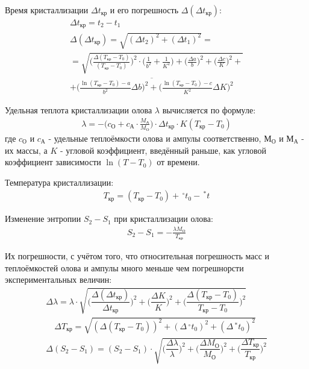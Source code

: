 \documentclass{article}
\begin{document}
Время кристаллизации $\Delta t_{ \text{кр}}$ и его погрешность $\Delta (\Delta t_{ \text{кр}})$:
\begin{gather*}
    \Delta t_{ \text{кр}} = t_2 - t_1\\
    \Delta (\Delta t_{ \text{кр}})=\sqrt{(\Delta t_2)^2+(\Delta t_1)^2} =\\ 
        =\sqrt{\bigg( \frac{ \Delta{(T_{\text{кр}}-T_0)}}{ (T_{\text{кр}}-T_0)} \bigg)^2\cdot\bigg( \frac{ 1}{ b^2} + \frac{ 1}{ K^2}\bigg)+\bigg( \frac{ \Delta{a}}{ b} \bigg)^2 + \bigg( \frac{ \Delta{c}}{ K} \bigg)^2 +} \\
         \overline{+  
        \bigg( \frac{ \ln(T_{ \text{кр}}-T_0)-a}{ b^2}\Delta{b} \bigg)^2 + \bigg( \frac{ \ln(T_{ \text{кр}}-T_0)-c}{ K^2}\Delta{K} \bigg)^2}
\end{gather*}

Удельная теплота кристаллизации олова $\lambda$ вычисляется по формуле:
\begin{gather*}
    \lambda = -\bigg( c_{ \text{О}} + c_{ \text{А}} \cdot \frac{ M_{ \text{А}}}{ M_{ \text{О}}} \bigg)
        \cdot \Delta t_{ \text{кр}} \cdot K(T_{ \text{кр}} - T_{ 0})
\end{gather*}
где $c_{ \text{О}}$ и $c_{ \text{А}}$ - удельные теплоёмкости олова и ампулы соответственно, 
$М_{ \text{О}}$ и $М_{ \text{А}}$ - их массы,
а $K$ - угловой коэффициент, введённый раньше, как угловой коэффициент зависимости $\ln(T-T_0)$ от времени.

Температура кристаллизации:
\begin{gather*}
    T_{ \text{кр}}=(T_{ \text{кр}}-T_0) + \,^\circ t_{ 0} - \,^*t
\end{gather*}

Изменение энтропии $S_2 - S_1$ при кристаллизации олова:
\begin{gather*}
    S_{ 2} - S_{ 1} = - \frac{ \lambda{M_{ \text{О}}}}{ T_{ \text{кр}}}
\end{gather*}

Их погрешности, с учётом того, что относительная погрешность масс и теплоёмкостей олова и ампулы много меньше чем погрешнорсти экспериментальных величин:
\begin{gather*}
    \Delta \lambda = \lambda\cdot\sqrt{
        \bigg(\dfrac{\Delta(\Delta t_{ \text{кр}})}{\Delta t_{ \text{кр}}}\bigg)^2 + 
        \bigg(\dfrac{\Delta K}{K}\bigg)^2 +
        \bigg(\dfrac{\Delta (T_{ \text{кр}}-T_0)}{T_{ \text{кр}}-T_0}\bigg)^2}\\
    \quad\Delta T_{ \text{кр}}=\sqrt{(\Delta (T_{ \text{кр}}-T_0))^2+(\Delta \,^\circ t_0)^2 + (\Delta \,^* t_0)^2}\\
    \Delta (S_2 - S_1) = (S_2 - S_1)\cdot\sqrt{
        \bigg(\dfrac{\Delta \lambda }{\lambda}\bigg)^2+
        \bigg(\dfrac{\Delta M_{ \text{О}}}{M_{ \text{О}}}\bigg)^2+
        \bigg(\dfrac{\Delta T_{ кр}}{T_{ кр}}\bigg)^2
    }
\end{gather*}
\end{document}
